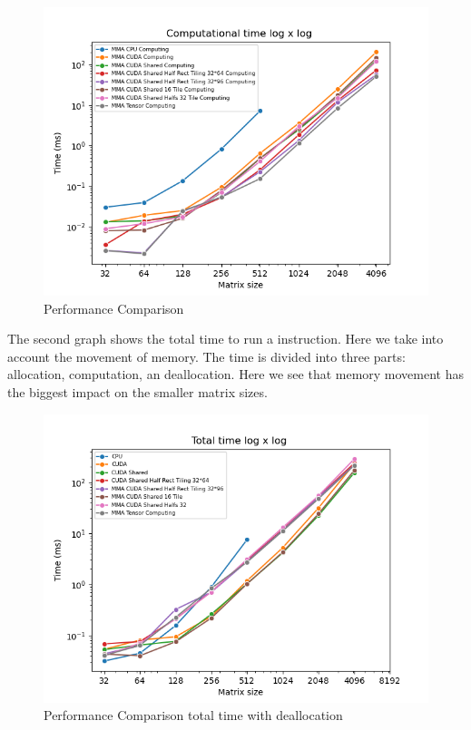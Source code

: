\documentclass[conference]{IEEEtran}
\begin{document}
  \begin{figure}[h]
    \centering
    \includegraphics[scale=0.5]{figures/Comp_time.png}
    \caption{Performance Comparison}
    \label{fig:performance-comparison}
  \end{figure}

  The second graph shows the total time to run a instruction. Here we take into account the movement of memory.
  The time is divided into three parts: allocation, computation, an deallocation.
  Here we see that memory movement has the biggest impact on the smaller matrix sizes.


  \begin{figure}[h]
    \centering
    \includegraphics[scale=0.5]{figures/Tot_time_deac.png}
    \caption{Performance Comparison total time with deallocation}
    \label{fig:time-comparison}
  \end{figure}
\end{document}
